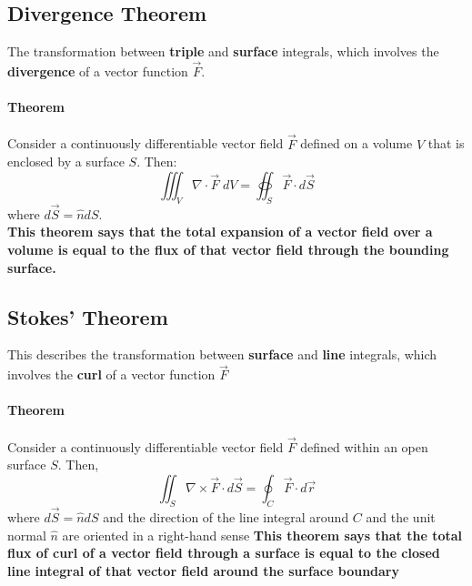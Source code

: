 \documentclass[11pt]{article}
\begin{document}
            \subsection{Divergence Theorem}\label{subsec:divergence-theorem}
                The transformation between \textbf{triple} and \textbf{surface} integrals, which involves the \textbf{divergence} of a vector function $\vec{F}$.
                \paragraph{Theorem} Consider a continuously differentiable vector field $\vec{F}$ defined on a volume $V$ that is enclosed by a surface $S$.
                Then:
                \begin{equation}
                    \label{eq:equation11}
                    \iiint_{V} \nabla \cdot \vec{F} \; dV = \oiint_{S} \vec{F} \cdot d\vec{S}
                \end{equation}
                where $d\vec{S} = \hat{n} dS$.\\
            \textbf{This theorem says that the total expansion of a vector field over a volume is equal to the flux
            of that vector field through the bounding surface.}
            \subsection{Stokes' Theorem}\label{subsec:stokes'-theorem}
                This describes the transformation between \textbf{surface} and \textbf{line} integrals, which involves
                the \textbf{curl} of a vector function $\vec{F}$
                \paragraph{Theorem} Consider a continuously differentiable vector field $\vec{F}$ defined
                within an open surface $S$.
                Then,
                \begin{equation}
                    \label{eq:equation12}
                    \iint_{S} \nabla \times \vec{F} \cdot d\vec{S} = \oint_{C} \vec{F} \cdot d\vec{r}
                \end{equation}
                where $d\vec{S} = \hat{n} dS$ and the direction of the line integral around $C$ and the unit
                normal $\hat{n}$ are oriented in a right-hand sense
                \textbf{This theorem says that the total flux of curl of a vector field through a surface is equal
                to the closed line integral of that vector field around the surface boundary}
\end{document}

